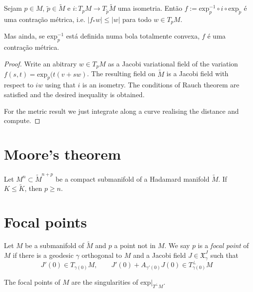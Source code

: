 \begin{proposition}
\label{proposition-contraction}
Sejam $p \in M$, $\tilde{p} \in \tilde{M}$ e $i:T_pM \to T_{\tilde{p}}\tilde{M}$
uma isometria. Então $f:=\text{exp}^{-1}_p \circ i \circ
\text{exp}_{\tilde{p}}$ é uma contração métrica, i.e. $|f_*w|\leq |w|$
para todo $w \in T_pM$.

Mas ainda, se $\text{exp}_p^{-1}$ está definida numa bola totalmente
convexa, $f$ é uma contração métrica.
\end{proposition}

\begin{proof}
Write an abitrary $w\in T_p M$ as a Jacobi variational field of the variation 
$f(s,t)=\text{exp}_p(t(v+sw)$. The resulting field on $\tilde{M}$ is a
Jacobi field with respect to $iw$ using that $i$ is an isometry. The conditions
of Rauch theorem are satisfied and the desired inequality is obtained.

For the metric result we just integrate along a curve realising the distance and
compute.
\end{proof}

\section{Moore's theorem}
\label{section-Moore}

\begin{theorem}[Moore]
\label{theorem-Moore}
Let $M^n \subset \tilde{M}^{n+p}$ be a compact submanifold of a Hadamard
manifold $\tilde{M}$. If $K\leq \tilde{K}$, then $p\geq n$.
\end{theorem}

\section{Focal points}
\label{section-focal points}

\begin{definition}
\label{definition-focal-point}
Let $M$ be a submanifold of $\tilde{M}$ and $p$ a point not in $M$. We say $p$
is a {\it focal point} of $M$ if there is a geodesic $\gamma$ orthogonal to $M$
and a Jacobi field $J\in\mathfrak{X}^J_\gamma$ such that
$$
J'(0)\in T_{\gamma(0)}M,\qquad J'(0)+A_{\gamma'(0)}J(0)\in T_{\gamma(0)}^\perp M
$$
\end{definition}

\begin{proposition}
\label{proposition-focal-points-are-singularities-of-normal-exponential}
The focal points of $M$ are the singularities of $\text{exp}|_{T^\perp M}.$
\end{proposition}

